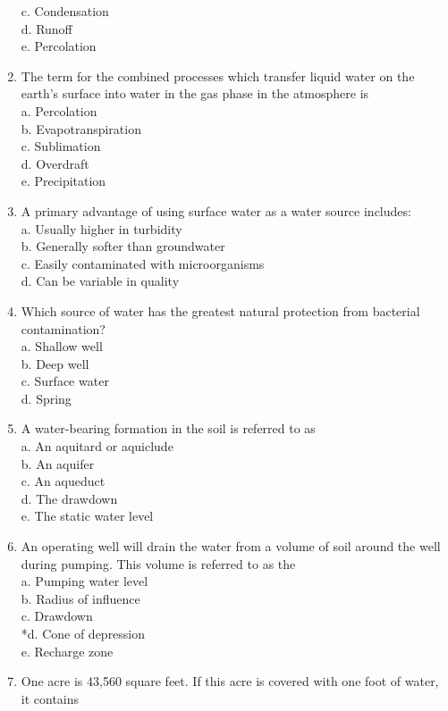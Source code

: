 \begin{enumerate}
c. Condensation\\
d. Runoff\\
e. Percolation\\
\item The term for the combined processes which transfer liquid water on the earth's surface into water in the gas phase in the atmosphere is\\
a. Percolation\\
b. Evapotranspiration\\
c. Sublimation\\
d. Overdraft\\
e. Precipitation\\
\item A primary advantage of using surface water as a water source includes:\\
a. Usually higher in turbidity\\
b. Generally softer than groundwater\\
c. Easily contaminated with microorganisms\\
d. Can be variable in quality\\
\item Which source of water has the greatest natural protection from bacterial contamination?\\
a. Shallow well\\
b. Deep well\\
c. Surface water\\
d. Spring\\
\item A water-bearing formation in the soil is referred to as\\
a. An aquitard or aquiclude\\
b. An aquifer\\
c. An aqueduct\\
d. The drawdown\\
e. The static water level
\item An operating well will drain the water from a volume of soil around the well during pumping. This volume is referred to as the\\
a. Pumping water level\\
b. Radius of influence\\
c. Drawdown\\
*d. Cone of depression\\
e. Recharge zone\\
\item One acre is 43,560 square feet. If this acre is covered with one foot of water, it contains\\

\end{enumerate}
